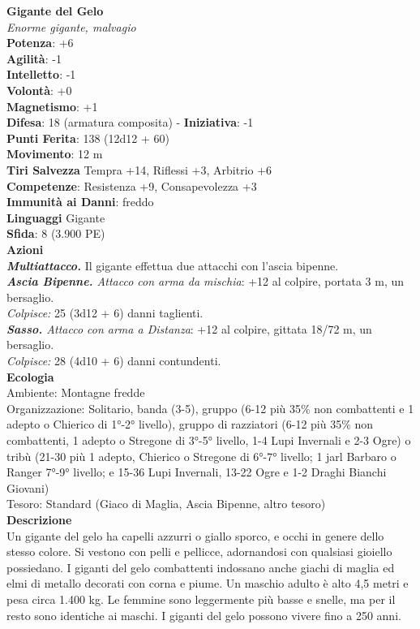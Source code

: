 \begin{multicols}{2}
\medskip\textbf{Gigante del Gelo}\\
\emph{Enorme gigante, malvagio}\\
\textbf{Potenza}: +6\\
\textbf{Agilità}: -1\\
\textbf{Intelletto}: -1\\
\textbf{Volontà}: +0\\
\textbf{Magnetismo}: +1\\
\textbf{Difesa}: 18 (armatura composita) - \textbf{Iniziativa}: -1\\
\textbf{Punti Ferita}: 138 (12d12 + 60)\\
\textbf{Movimento}: 12 m\\
\textbf{Tiri Salvezza} Tempra +14, Riflessi +3, Arbitrio +6\\
\textbf{Competenze}: Resistenza +9, Consapevolezza +3\\
\textbf{Immunità ai Danni}: freddo\\
\textbf{Linguaggi} Gigante\\
\textbf{Sfida}: 8 (3.900 PE)\smallskip\\
\smallskip\textbf{Azioni}\\
\emph{\textbf{Multiattacco.}} Il gigante effettua due attacchi con l'ascia bipenne.\\
\emph{\textbf{Ascia Bipenne.} Attacco con arma da mischia}: +12 al colpire, portata 3 m, un bersaglio.\\
\emph{Colpisce:} 25 (3d12 + 6) danni taglienti.\\
\emph{\textbf{Sasso.} Attacco con arma a Distanza}: +12 al colpire, gittata 18/72 m, un bersaglio.\\
\emph{Colpisce:} 28 (4d10 + 6) danni contundenti.\\
\textbf{Ecologia}\\
Ambiente: Montagne fredde\\
Organizzazione: Solitario, banda (3-5), gruppo (6-12 più 35\% non combattenti e 1 adepto o Chierico di 1°-2° livello), gruppo di razziatori (6-12 più 35\% non combattenti, 1 adepto o Stregone di 3°-5° livello, 1-4 Lupi Invernali e 2-3 Ogre) o tribù (21-30 più 1 adepto, Chierico o Stregone di 6°-7° livello; 1 jarl Barbaro o Ranger 7°-9° livello; e 15-36 Lupi Invernali, 13-22 Ogre e 1-2 Draghi Bianchi Giovani)\\
Tesoro: Standard (Giaco di Maglia, Ascia Bipenne, altro tesoro)\\
\textbf{Descrizione}\\
Un gigante del gelo ha capelli azzurri o giallo sporco, e occhi in genere dello stesso colore. Si vestono con pelli e pellicce, adornandosi con qualsiasi gioiello possiedano. I giganti del gelo combattenti indossano anche giachi di maglia ed elmi di metallo decorati con corna e piume. Un maschio adulto è alto 4,5 metri e pesa circa 1.400 kg. Le femmine sono leggermente più basse e snelle, ma per il resto sono identiche ai maschi. I giganti del gelo possono vivere fino a 250 anni.\\


\end{multicols}
